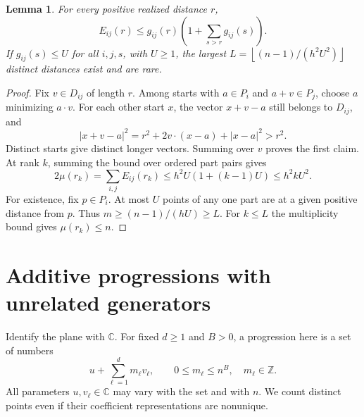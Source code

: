 \documentclass[10pt,letterpaper]{article}
\newtheorem{lemma}[theorem]{Lemma}
\newcommand{\C}{\mathbb C}
\newcommand{\Z}{\mathbb Z}
\newcommand{\floor}[1]{\left\lfloor #1\right\rfloor}
\begin{document}
\begin{lemma}\label{switch}
For every positive realized distance $r$,
\[
 E_{ij}(r)\le g_{ij}(r)\left(1+\sum_{s>r}g_{ij}(s)\right).
\]
If $g_{ij}(s)\le U$ for all $i,j,s$, with $U\ge1$, the largest
$L=\floor{(n-1)/(h^2U^2)}$ distinct distances exist and are rare.
\end{lemma}
\begin{proof}
Fix $v\in D_{ij}$ of length $r$. Among starts with $a\in P_i$ and $a+v\in P_j$, choose $a$ minimizing $a\cdot v$. For each other start $x$, the vector $x+v-a$ still belongs to $D_{ij}$, and
\[
 |x+v-a|^2=r^2+2v\cdot(x-a)+|x-a|^2>r^2.
\]
Distinct starts give distinct longer vectors. Summing over $v$ proves the first claim. At rank $k$, summing the bound over ordered part pairs gives
\[
 2\mu(r_k)=\sum_{i,j}E_{ij}(r_k)\le h^2U(1+(k-1)U)\le h^2 kU^2.
\]
For existence, fix $p\in P_i$. At most $U$ points of any one part are at a given positive distance from $p$. Thus $m\ge(n-1)/(hU)\ge L$. For $k\le L$ the multiplicity bound gives $\mu(r_k)\le n$. 
\end{proof}

\section{Additive progressions with unrelated generators}
Identify the plane with $\C$. For fixed $d\ge1$ and $B>0$, a progression here is a set of numbers
\[
 u+\sum_{\ell=1}^d m_\ell v_\ell,\qquad 0\le m_\ell\le n^B,\quad m_\ell\in\Z.
\]
All parameters $u,v_\ell\in\C$ may vary with the set and with $n$. We count distinct points even if their coefficient representations are nonunique.
\end{document}
